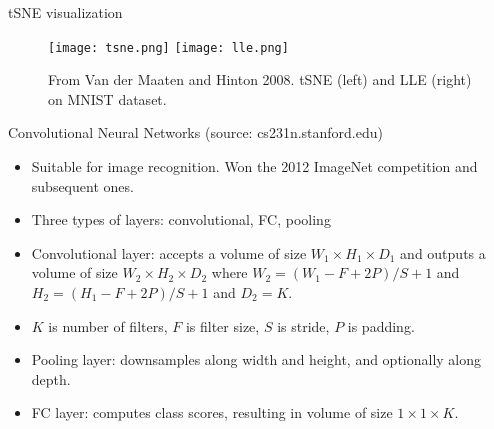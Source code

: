 \documentclass[final]{beamer}
\begin{document}
\begin{frame}{tSNE visualization}
\begin{figure}
	\texttt{[image: tsne.png]}
	\texttt{[image: lle.png]}
	\caption{From Van der Maaten and Hinton 2008. tSNE (left) and LLE (right) on MNIST dataset. }
\end{figure}
\end{frame}
\begin{frame}{Convolutional Neural Networks (source: cs231n.stanford.edu)}
	\begin{itemize}
		\item Suitable for image recognition. Won the 2012 ImageNet competition and subsequent ones.
		\item Three types of layers: convolutional, FC, pooling
		\item Convolutional layer: accepts a volume of size $W_1 \times H_1 \times D_1$ and outputs a volume of size $W_2 \times H_2 \times D_2$ where $W_2 = (W_1 - F + 2P)/S + 1$ and $H_2 = (H_1 - F + 2P)/S + 1$ and $D_2 = K$.

		\item $K$ is number of filters, $F$ is filter size, $S$ is stride, $P$ is padding.
		\item Pooling layer: downsamples along width and height, and optionally along depth.
		\item FC layer: computes class scores, resulting in volume of size $1 \times 1 \times K$.

	
	\end{itemize}
\end{frame}
\end{document}
